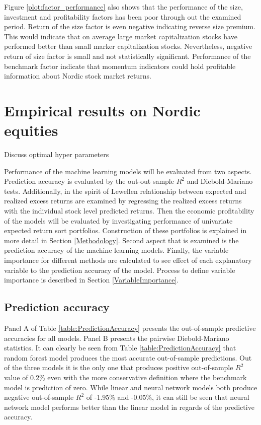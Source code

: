 \documentclass{article}
\begin{document}
Figure \ref{plot:factor_performance} also shows that the performance of the size, investment and profitability factors has been poor through out the examined period. Return of the size factor is even negative indicating reverse size premium. This would indicate that on average large market capitalization stocks have performed better than small marker capitalization stocks. Nevertheless, negative return of size factor is small and not statistically significant. Performance of the benchmark factor indicate that momentum indicators could hold profitable information about Nordic stock market returns. \par

\section{Empirical results on Nordic equities}

Discuss optimal hyper parameters

Performance of the machine learning models will be evaluated from two aspects. Prediction accuracy is evaluated by the out-out sample $R^2$ and Diebold-Mariano tests. Additionally, in the spirit of Lewellen \citeyear{Lewellen2015} relationship between expected and realized excess returns are examined by regressing the realized excess returns with the individual stock level predicted returns. Then the economic profitability of the models will be evaluated by investigating performance of univariate expected return sort portfolios. Construction of these portfolios is explained in more detail in Section \ref{Methodology}. Second aspect that is examined is the prediction accuracy of the machine learning models.  Finally, the variable importance for different methods are calculated to see effect of each explanatory variable to the prediction accuracy of the model. Process to define variable importance is described in Section \ref{VariableImportance}. \par

\subsection{Prediction accuracy}\label{PredictionAccuracy}

Panel A of Table \ref{table:PredictionAccuracy} presents the out-of-sample predictive accuracies for all models. Panel B presents the pairwise Diebold-Mariano statistics. It can clearly be seen from Table \ref{table:PredictionAccuracy} that random forest model produces the most accurate out-of-sample predictions. Out of the three models it is the only one that produces positive out-of-sample $R^2$ value of 0.2\% even with the more conservative definition where the benchmark model is prediction of zero. While linear and neural network models both produce negative out-of-sample $R^2$ of -1.95\% and -0.05\%, it can still be seen that neural network model performs better than the linear model in regards of the predictive accuracy. \par
\end{document}
